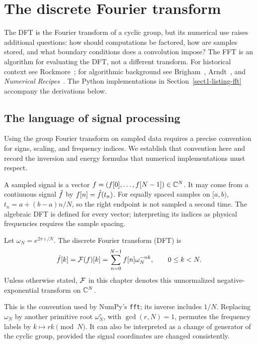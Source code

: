 \chapter{The discrete Fourier transform}
\label{chap-tfd}

The DFT is the Fourier transform of a cyclic group, but its numerical use
raises additional questions: how should computations be factored, how are
samples stored, and what boundary conditions does a convolution impose?
The FFT is an algorithm for evaluating the DFT, not a different transform.
For historical context see Rockmore~\cite{rockmore-fft}; for algorithmic
background see Brigham~\cite{brigham-fft}, Arndt~\cite{arndt-algo-programmers},
and \emph{Numerical Recipes}~\cite{nr}. The Python implementations in
Section~\ref{sect1-listing-fft} accompany the derivations below.

\section{The language of signal processing}
\label{sect1-language-processing-signal}\label{notation-42}

Using the group Fourier transform on sampled data requires a precise
convention for signs, scaling, and frequency indices. We establish that
convention here and record the inversion and energy formulas that numerical
implementations must respect.

A sampled signal is a vector $f=(f[0],\ldots,f[N-1])\in\mathbb{C}^N$.
It may come from a continuous signal $\tilde{f}$ by $f[n]=\tilde{f}(t_n)$.
For equally spaced samples on $[a,b)$,
$t_n=a+(b-a)n/N$, so the right endpoint is not sampled a second time.
The algebraic DFT is defined for every vector; interpreting its indices as
physical frequencies requires the sample spacing.

\begin{defn}
\label{notation-43}
Let $\omega_N=e^{2\pi\imath/N}$. The discrete Fourier transform (DFT) is
\begin{equation}
\label{eq-defn-tfd}
 \hat{f}[k]=\mathcal{F}(f)[k]=\sum_{n=0}^{N-1}f[n]\omega_N^{-nk},
 \qquad 0\leq k<N.
\end{equation}
Unless otherwise stated, $\mathcal{F}$ in this chapter denotes this unnormalized
negative-exponential transform on $\mathbb{C}^N$.
\end{defn}
This is the convention used by NumPy's \texttt{fft}; its inverse includes
$1/N$. Replacing $\omega_N$ by another primitive root $\omega_N^r$,
with $\gcd(r,N)=1$, permutes the frequency labels by $k\mapsto rk\pmod N$.
It can also be interpreted as a change of generator of the cyclic group,
provided the signal coordinates are changed consistently.

